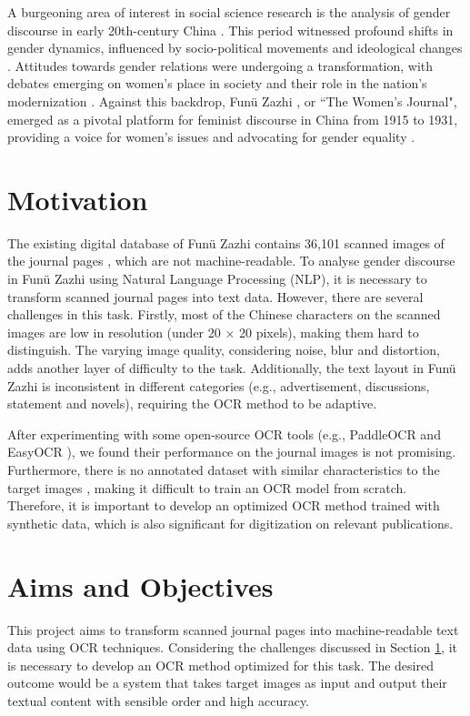 \documentclass[12pt,twoside]{report}
\begin{document}
A burgeoning area of interest in social science research is the analysis of gender discourse in early 20th-century China \cite{bailey2007gender,li2011changing}. This period witnessed profound shifts in gender dynamics, influenced by socio-political movements and ideological changes \cite{li2011changing,hershatter2004state}. Attitudes towards gender relations were undergoing a transformation, with debates emerging on women's place in society and their role in the nation's modernization \cite{hershatter2004state}. Against this backdrop, Funü Zazhi \cite{fnzz}, or ``The Women's Journal", emerged as a pivotal platform for feminist discourse in China from 1915 to 1931, providing a voice for women's issues and advocating for gender equality \cite{nivard1984women}.

\section{Motivation}
\label{sec:motivation}
The existing digital database of Funü Zazhi \cite{fnzz} contains 36,101 scanned images of the journal pages \cite{fnzzpages}, which are not machine-readable. To analyse gender discourse in Funü Zazhi \cite{fnzz} using Natural Language Processing (NLP), it is necessary to transform scanned journal pages into text data. However, there are several challenges in this task. Firstly, most of the Chinese characters on the scanned images \cite{fnzzpages} are low in resolution (under 20 $\times$ 20 pixels), making them hard to distinguish. The varying image quality, considering noise, blur and distortion, adds another layer of difficulty to the task. Additionally, the text layout in Funü Zazhi \cite{fnzz} is inconsistent in different categories (e.g., advertisement, discussions, statement and novels), requiring the OCR method to be adaptive.

After experimenting with some open-source OCR tools (e.g., PaddleOCR \cite{paddle} and EasyOCR \cite{easyocr}), we found their performance on the journal images \cite{fnzzpages} is not promising. Furthermore, there is no annotated dataset with similar characteristics to the target images \cite{fnzzpages}, making it difficult to train an OCR model from scratch. Therefore, it is important to develop an optimized OCR method trained with synthetic data, which is also significant for digitization on relevant publications.

\section{Aims and Objectives}
\label{sec:objectives}
This project aims to transform scanned journal pages \cite{fnzzpages} into machine-readable text data using OCR techniques. Considering the challenges discussed in Section \ref{sec:motivation}, it is necessary to develop an OCR method optimized for this task. The desired outcome would be a system that takes target images \cite{fnzzpages} as input and output their textual content with sensible order and high accuracy.
\end{document}
